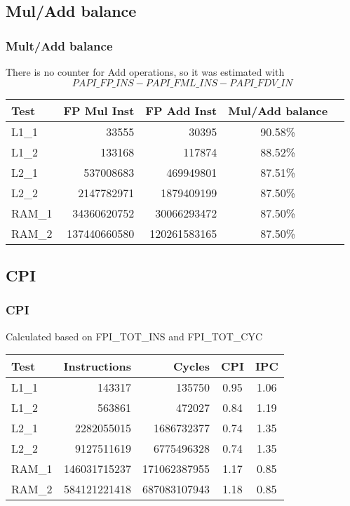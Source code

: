 \documentclass{beamer}
\begin{document}
\subsection{Mul/Add balance}
\begin{frame}
	\frametitle{Mult/Add balance}

	There is no counter for Add operations, so it was estimated with
	$$PAPI\_FP\_INS - PAPI\_FML\_INS - PAPI\_FDV\_IN$$

	\begin{table}[!htp]
		\begin{center}
		{\small
			\begin{tabular}{|l|r|r|c|c|}

				\hline
				Test	&	FP Mul Inst		&	FP Add Inst		&	Mul/Add balance	\\
				\hline
				L1\_1	&	33555			&	30395			&	90.58\%			\\
				L1\_2	&	133168			&	117874			&	88.52\%			\\
				L2\_1	&	537008683		&	469949801		&	87.51\%			\\
				L2\_2	&	2147782971		&	1879409199		&	87.50\%			\\
				RAM\_1	&	34360620752		&	30066293472		&	87.50\%			\\
				RAM\_2	&	137440660580	&	120261583165	&	87.50\%			\\
				\hline
			\end{tabular}
		}
		\end{center}
	\end{table}
\end{frame}

\subsection{CPI}
\begin{frame}
	\frametitle{CPI}

	Calculated based on FPI\_TOT\_INS and FPI\_TOT\_CYC

	\begin{table}[!htp]
		\begin{center}
		{\small
			\begin{tabular}{|l|r|r|c|c|}

				\hline
				Test	&	Instructions	&	Cycles			&	CPI		&	IPC		\\
				\hline
				L1\_1	&	143317			&	135750			&	0.95	&	1.06	\\
				L1\_2	&	563861			&	472027			&	0.84	&	1.19	\\
				L2\_1	&	2282055015		&	1686732377		&	0.74	&	1.35	\\
				L2\_2	&	9127511619		&	6775496328		&	0.74	&	1.35	\\
				RAM\_1	&	146031715237	&	171062387955	&	1.17	&	0.85	\\
				RAM\_2	&	584121221418	&	687083107943	&	1.18	&	0.85	\\
				\hline
			\end{tabular}
		}
		\end{center}
	\end{table}
\end{frame}
\end{document}
